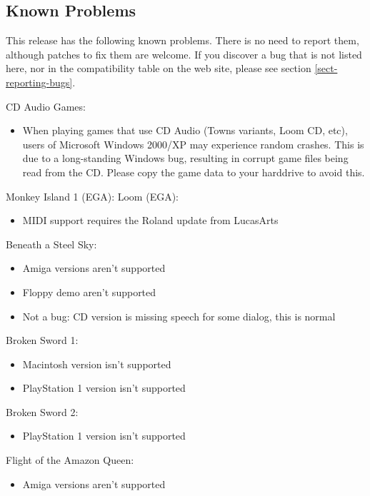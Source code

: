

\subsection{Known Problems}

This release has the following known problems. There is no need to report them,
although patches to fix them are welcome. If you discover a bug that is not
listed here, nor in the compatibility table on the web site, please see
section \ref{sect-reporting-bugs}.

CD Audio Games:
  \begin{itemize}
  \item When playing games that use CD Audio (Towns variants, Loom CD, etc),
                 users of Microsoft Windows 2000/XP may experience random crashes.
                 This is due to a long-standing Windows bug, resulting in corrupt
                 game files being read from the CD. Please copy the game data to
                 your harddrive to avoid this.
  \end{itemize}
Monkey Island 1 (EGA):
Loom (EGA):
  \begin{itemize}
  \item MIDI support requires the Roland update from LucasArts
  \end{itemize}
Beneath a Steel Sky:
  \begin{itemize}
  \item Amiga versions aren't supported
  \item Floppy demo aren't supported
  \item Not a bug: CD version is missing speech for some dialog, this is
                 normal
  \end{itemize}
Broken Sword 1:
  \begin{itemize}
  \item Macintosh version isn't supported
  \item PlayStation 1 version isn't supported
  \end{itemize}
Broken Sword 2:
  \begin{itemize}
  \item PlayStation 1 version isn't supported
  \end{itemize}
Flight of the Amazon Queen:
  \begin{itemize}
  \item Amiga versions aren't supported
  \end{itemize}
